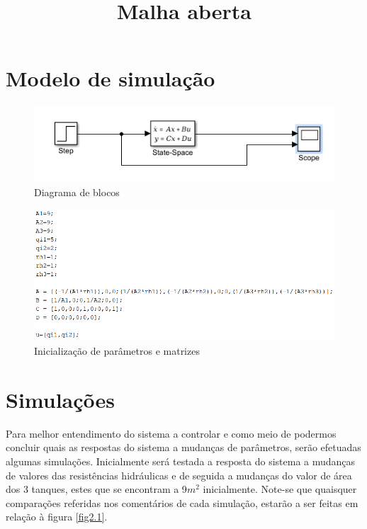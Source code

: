 \documentclass[11pt]{article}
\begin{document}
\title{Malha aberta}
\maketitle

\section{Modelo de simulação}
\begin{figure}[!h]
\begin{center}
\includegraphics[width=12cm]{modelo.PNG}
\caption{Diagrama de blocos}
\label{fig1.1}
\end{center}
\end{figure}
\begin{figure}[!h]
\includegraphics[width=15cm]{params.png}
\caption{Inicialização de parâmetros e matrizes}
\label{fig1.2}
\end{figure}

\pagebreak
\section{Simulações}
Para melhor entendimento do sistema a controlar e como meio de podermos concluir quais as respostas do sistema a mudanças de parâmetros, serão efetuadas algumas simulações.
Inicialmente será testada a resposta do sistema a mudanças de valores das resistências hidráulicas e de seguida a mudanças do valor de área dos 3 tanques, estes que se encontram a 9$m^2$ inicialmente.
Note-se que quaisquer comparações referidas nos comentários de cada simulação, estarão a ser feitas em relação à figura \ref{fig2.1}.
\end{document}
